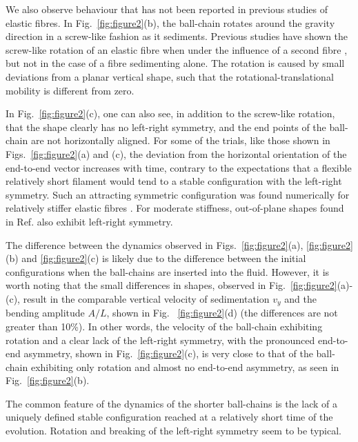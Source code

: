 \documentclass{article}
\begin{document}
We also observe behaviour that has not been reported %
in previous studies of elastic %
fibres.  In Fig.~\ref{fig:figure2}(b), the ball-chain rotates %
around the gravity direction in a screw-like fashion as it sediments. Previous studies have shown the screw-like rotation of an elastic %
fibre when under the influence of a second fibre \cite{saggiorato2015conformations}, but not in the case of a fibre sedimenting alone. The rotation is caused by small deviations from a planar vertical shape, such that the rotational-translational mobility is different from zero.

In Fig.~\ref{fig:figure2}(c), one can also see, in addition to the screw-like rotation, that the shape clearly has no left-right symmetry, and the end points of the ball-chain are not horizontally aligned. For some of the trials, like those shown in Figs.~\ref{fig:figure2}(a) and (c), the deviation from the horizontal orientation of the end-to-end vector increases with time, contrary to the expectations that a flexible relatively short filament would tend to a stable configuration with the left-right symmetry. Such an attracting symmetric configuration was found numerically for relatively stiffer elastic fibres \cite{lagomarsino2005hydrodynamic,schlagberger2005orientation,manghi2006,saggiorato2015conformations,bukowicki2018different,bukowicki2019sedimenting}. For moderate stiffness, out-of-plane shapes found in Ref. \cite{saggiorato2015conformations} also exhibit left-right symmetry.

The difference between the dynamics observed in Figs.~\ref{fig:figure2}(a), \ref{fig:figure2}(b) and \ref{fig:figure2}(c) is likely due to the difference between the initial configurations %
when the ball-chains are inserted into the fluid. However, it is worth noting that the small differences in shapes, observed in Fig.~\ref{fig:figure2}(a)-(c), result in the comparable vertical velocity of sedimentation $v_y$ and the bending amplitude $A/L$, shown in Fig.~ \ref{fig:figure2}(d) %
(the differences are not greater than 10\%). In other words, the velocity of the ball-chain exhibiting rotation and a clear lack of the left-right symmetry, with the pronounced end-to-end asymmetry, shown in Fig.~\ref{fig:figure2}(c), is very close to that of the ball-chain exhibiting only rotation and almost no end-to-end asymmetry, as seen in Fig.~\ref{fig:figure2}(b). %

The common feature of the dynamics of the shorter ball-chains is the lack of a uniquely defined stable configuration reached at a relatively short time of the evolution. Rotation and breaking of the left-right symmetry seem to be typical. 
\end{document}
